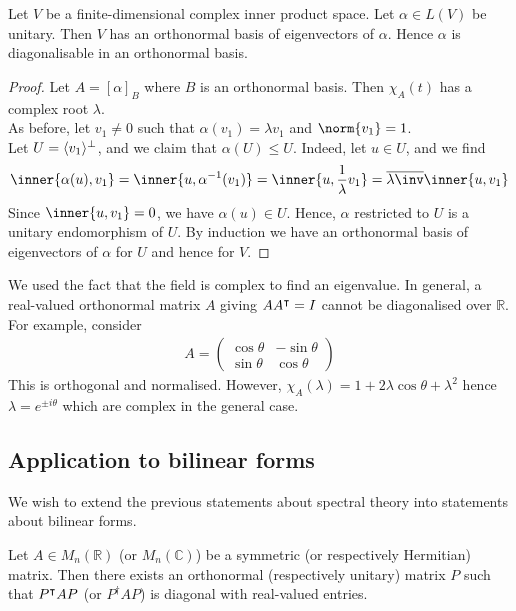 \begin{theorem}
	Let $V$ be a finite-dimensional complex inner product space.
	Let $\alpha \in L(V)$ be unitary.
	Then $V$ has an orthonormal basis of eigenvectors of $\alpha$.
	Hence $\alpha$ is diagonalisable in an orthonormal basis.
\end{theorem}

\begin{proof}
	Let $A = [\alpha]_B$ where $B$ is an orthonormal basis.
	Then $\chi_A(t)$ has a complex root $\lambda$. \\
	As before, let $v_1 \neq 0$ such that $\alpha(v_1) = \lambda v_1$ and $\norm{v_1} = 1$. \\
	Let $U = \langle{} v_1 \rangle^\perp$, and we claim that $\alpha(U) \leq U$.
	Indeed, let $u \in U$, and we find
	\begin{align*}
		\inner{\alpha(u), v_1} = \inner{u, \alpha^{-1}(v_1)} = \inner{u, \frac{1}{\lambda} v_1} = \overline{\lambda\inv} \inner{u,v_1}
	\end{align*}
	Since $\inner{u, v_1} = 0$, we have $\alpha(u) \in U$.
	Hence, $\alpha$ restricted to $U$ is a unitary endomorphism of $U$.
	By induction we have an orthonormal basis of eigenvectors of $\alpha$ for $U$ and hence for $V$.
\end{proof}

\begin{remark}
	We used the fact that the field is complex to find an eigenvalue.
	In general, a real-valued orthonormal matrix $A$ giving $A A^\intercal = I$ cannot be diagonalised over $\mathbb R$.
	For example, consider
	\begin{align*}
		A = \begin{pmatrix}
			\cos\theta & -\sin\theta \\
			\sin\theta & \cos\theta
		\end{pmatrix}
	\end{align*}
	This is orthogonal and normalised.
	However, $\chi_A(\lambda) = 1 + 2\lambda \cos\theta + \lambda^2$ hence $\lambda = e^{\pm i \theta}$ which are complex in the general case.
\end{remark}

\subsection{Application to bilinear forms}
We wish to extend the previous statements about spectral theory into statements about bilinear forms.
\begin{corollary}
	Let $A \in M_n(\mathbb R)$ (or $M_n(\mathbb C)$) be a symmetric (or respectively Hermitian) matrix.
	Then there exists an orthonormal (respectively unitary) matrix $P$ such that $P^\intercal A P$ (or $P^\dagger A P$) is diagonal with real-valued entries.
\end{corollary}

